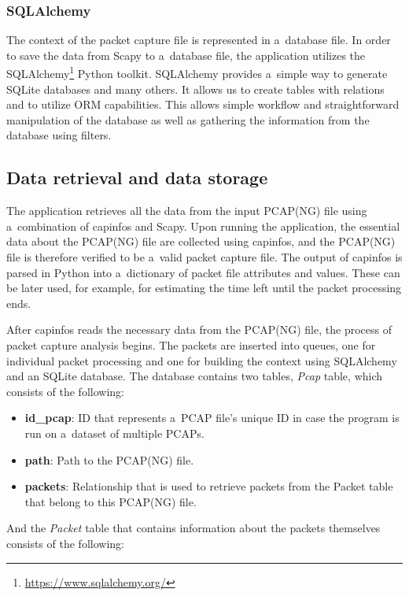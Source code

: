 \documentclass[
  printed,     %
  color,       %
  oneside,     %
  nosansbold,  %
  nocolorbold, %
  nolof,         %
  nolot,         %
]{fithesis4}
\begin{document}
\subsubsection{SQLAlchemy}

The context of the packet capture file is represented in a~database file. In order to save the data from Scapy to a~database file, the application utilizes the SQLAlchemy\footnote{\url{https://www.sqlalchemy.org/}} Python toolkit. SQLAlchemy provides a~simple way to generate SQLite databases and many others. It allows us to create tables with relations and to utilize ORM capabilities. This allows simple workflow and straightforward manipulation of the database as well as gathering the information from the database using filters.

\subsection{Data retrieval and data storage}
\label{sec:ds}

The application retrieves all the data from the input PCAP(NG) file using a~combination of capinfos and Scapy. Upon running the application, the essential data about the PCAP(NG) file are collected using capinfos, and the PCAP(NG) file is therefore verified to be a~valid packet capture file. The output of capinfos is parsed in Python into a~dictionary of packet file attributes and values. These can be later used, for example, for estimating the time left until the packet processing ends.

After capinfos reads the necessary data from the PCAP(NG) file, the process of packet capture analysis begins. The packets are inserted into queues, one for individual packet processing and one for building the context using SQLAlchemy and an SQLite database. The database contains two tables, \textit{Pcap} table, which consists of the following:

\begin{itemize}[noitemsep,topsep=0pt]
    \item \textbf{id\_pcap}: ID that represents a~PCAP file's unique ID in case the program is run on a~dataset of multiple PCAPs.
    \item \textbf{path}: Path to the PCAP(NG) file.
    \item \textbf{packets}: Relationship that is used to retrieve packets from the Packet table that belong to this PCAP(NG) file.
\end{itemize}

And the \textit{Packet} table that contains information about the packets themselves consists of the following:
\end{document}
